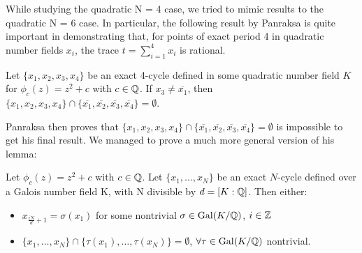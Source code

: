 While studying the quadratic N = 4 case, we tried to mimic results
to the quadratic N = 6 case. In particular, the following result by
Panraksa is quite important in demonstrating that, for points of exact
period 4 in quadratic number fields $x_i$, the trace $t = \sum\limits_
{i=1}^4 x_i$ is rational.

\begin{theorem} 
	Let $\{x_1, x_2, x_3, x_4\}$ be an exact 4-cycle defined in some
	quadratic number field $K$ for $\phi_c(z) = z^2 + c$ with $c \in \mathbb{Q}$.
	If $x_3 \neq \overline{x_1}$, then $\{x_1, x_2, x_3, x_4\} \cap
	\{\overline{x_1}, \overline{x_2}, \overline{x_3}, \overline{x_4}\}
	= \emptyset$.
\end{theorem}

Panraksa then proves that $\{x_1, x_2, x_3, x_4\} \cap
\{\overline{x_1}, \overline{x_2}, \overline{x_3}, \overline{x_4}\}
= \emptyset$ is impossible to get his final result. We managed to prove
a much more general version of his lemma:

\begin{theorem}
	Let $\phi_c(z) = z^2 + c$ with $c \in \mathbb{Q}$. Let $\{x_1, \ldots, x_{N}\}$ be
	an exact $N$-cycle defined over a Galois number field K, with N
	divisible by	$d = [K:\mathbb{Q} ]$. Then either: \\
	\begin{itemize}
	\item $x_{\frac{iN}{d}+1} = \sigma(x_1)$ for some nontrivial $\sigma \in
	\mathrm{Gal}(K/\mathbb{Q})$, $i \in \mathbb{Z}$
	\item $\{x_1, \ldots, x_{N}\} \cap \{\tau(x_1), \ldots, \tau(x_{N})\} =
	\emptyset$, $\forall \tau \in \mathrm{Gal}(K/\mathbb{Q})$ nontrivial.
	\end{itemize}
\end{theorem}

